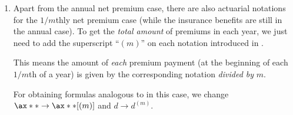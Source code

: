 \begin{enumerate}
\item Apart from the annual net premium case, there are also actuarial
notations for the \(1/m\)thly net premium case (while the insurance benefits
are still in the annual case). To get the \emph{total amount} of premiums in each
year, we just need to add the superscript ``\((m)\)'' on each notation
introduced in .

\begin{warning}
This means the amount of \emph{each} premium payment (at the beginning of
each \(1/m\)th of a year) is given by the corresponding notation \emph{divided
by} \(m\).
\end{warning}

For obtaining formulas analogous to  in this case,
we change \(\ax**{}\to\ax**{}[(m)]\) and \(d\to d^{(m)}\).
\end{enumerate}
